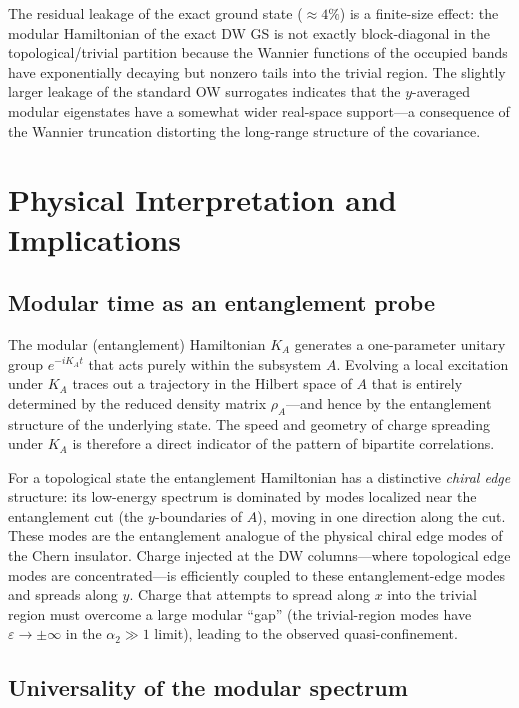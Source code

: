 \documentclass[aps,prb,twocolumn,superscriptaddress,floatfix]{revtex4-2}
\newcommand{\hmod}{K_A}
\begin{document}
The residual leakage of the exact ground state ($\approx 4\%$) is a
finite-size effect: the modular Hamiltonian of the exact DW GS is
not exactly block-diagonal in the topological/trivial partition because
the Wannier functions of the occupied bands have exponentially decaying
but nonzero tails into the trivial region.  The slightly larger leakage of
the standard OW surrogates indicates that the $y$-averaged modular
eigenstates have a somewhat wider real-space support—a consequence of the
Wannier truncation distorting the long-range structure of the covariance.

\section{Physical Interpretation and Implications}
\label{sec:discussion}

\subsection{Modular time as an entanglement probe}

The modular (entanglement) Hamiltonian $\hmod$ generates a one-parameter
unitary group $e^{-i\hmod t}$ that acts purely within the subsystem $A$.
Evolving a local excitation under $\hmod$ traces out a trajectory in the
Hilbert space of $A$ that is entirely determined by the reduced density
matrix $\rho_A$—and hence by the entanglement structure of the underlying
state.  The speed and geometry of charge spreading under $\hmod$ is therefore
a direct indicator of the pattern of bipartite correlations.

For a topological state the entanglement Hamiltonian has a distinctive
\emph{chiral edge} structure: its low-energy spectrum is dominated by modes
localized near the entanglement cut (the $y$-boundaries of $A$), moving
in one direction along the cut.  These modes are the entanglement analogue
of the physical chiral edge modes of the Chern insulator.  Charge injected
at the DW columns—where topological edge modes are concentrated—is
efficiently coupled to these entanglement-edge modes and spreads along $y$.
Charge that attempts to spread along $x$ into the trivial region must
overcome a large modular ``gap'' (the trivial-region modes have
$\varepsilon \to \pm \infty$ in the $\alpha_2 \gg 1$ limit), leading to
the observed quasi-confinement.

\subsection{Universality of the modular spectrum}
\end{document}
